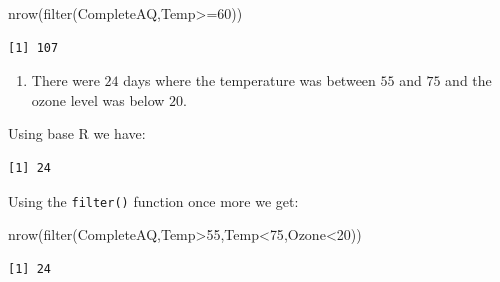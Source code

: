 \documentclass[
  letterpaper,
  DIV=11,
  numbers=noendperiod]{scrreprt}
\newenvironment{Shaded}{\begin{snugshade}}{\end{snugshade}}
\newcommand{\DecValTok}[1]{\textcolor[rgb]{0.68,0.00,0.00}{#1}}
\newcommand{\FunctionTok}[1]{\textcolor[rgb]{0.28,0.35,0.67}{#1}}
\newcommand{\NormalTok}[1]{\textcolor[rgb]{0.00,0.23,0.31}{#1}}
\newcommand{\SpecialCharTok}[1]{\textcolor[rgb]{0.37,0.37,0.37}{#1}}
\providecommand{\tightlist}{%
  \setlength{\itemsep}{0pt}\setlength{\parskip}{0pt}}\usepackage{longtable,booktabs,array}
\begin{document}
\begin{Shaded}
\begin{Highlighting}[numbers=left,,]
\FunctionTok{nrow}\NormalTok{(}\FunctionTok{filter}\NormalTok{(CompleteAQ,Temp}\SpecialCharTok{\textgreater{}=}\DecValTok{60}\NormalTok{))}
\end{Highlighting}
\end{Shaded}

\begin{verbatim}
[1] 107
\end{verbatim}

\begin{enumerate}
\def\labelenumi{\arabic{enumi}.}
\setcounter{enumi}{5}
\tightlist
\item
  There were \(24\) days where the temperature was between \(55\) and
  \(75\) and the ozone level was below \(20\).
\end{enumerate}

Using base R we have:

\begin{Shaded}
\end{Shaded}

\begin{verbatim}
[1] 24
\end{verbatim}

Using the \texttt{filter()} function once more we get:

\begin{Shaded}
\begin{Highlighting}[numbers=left,,]
\FunctionTok{nrow}\NormalTok{(}\FunctionTok{filter}\NormalTok{(CompleteAQ,Temp}\SpecialCharTok{\textgreater{}}\DecValTok{55}\NormalTok{,Temp}\SpecialCharTok{\textless{}}\DecValTok{75}\NormalTok{,Ozone}\SpecialCharTok{\textless{}}\DecValTok{20}\NormalTok{))}
\end{Highlighting}
\end{Shaded}

\begin{verbatim}
[1] 24
\end{verbatim}
\end{document}
